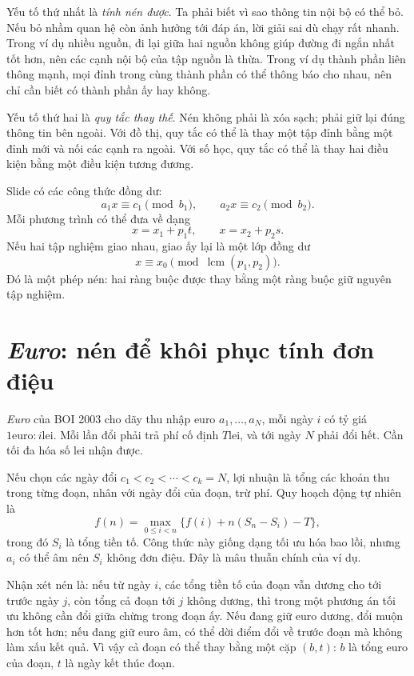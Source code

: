 \documentclass[11pt]{article}
\newcommand{\lei}{\ensuremath{\mathrm{lei}}}
\newcommand{\euro}{\ensuremath{\mathrm{euro}}}
\begin{document}
Yếu tố thứ nhất là \emph{tính nén được}. Ta phải biết vì sao thông tin nội bộ
có thể bỏ. Nếu bỏ nhầm quan hệ còn ảnh hưởng tới đáp án, lời giải sai dù chạy
rất nhanh. Trong ví dụ nhiều nguồn, đi lại giữa hai nguồn không giúp đường đi
ngắn nhất tốt hơn, nên các cạnh nội bộ của tập nguồn là thừa. Trong ví dụ
thành phần liên thông mạnh, mọi đỉnh trong cùng thành phần có thể thông báo
cho nhau, nên chỉ cần biết có thành phần ấy hay không.

Yếu tố thứ hai là \emph{quy tắc thay thế}. Nén không phải là xóa sạch; phải
giữ lại đúng thông tin bên ngoài. Với đồ thị, quy tắc có thể là thay một tập
đỉnh bằng một đỉnh mới và nối các cạnh ra ngoài. Với số học, quy tắc có thể
là thay hai điều kiện bằng một điều kiện tương đương.

Slide có các công thức đồng dư:
\[
  a_1x \equiv c_1 \pmod {b_1},\qquad
  a_2x \equiv c_2 \pmod {b_2}.
\]
Mỗi phương trình có thể đưa về dạng
\[
  x=x_1+p_1t,\qquad x=x_2+p_2s.
\]
Nếu hai tập nghiệm giao nhau, giao ấy lại là một lớp đồng dư
\[
  x\equiv x_0 \pmod{\operatorname{lcm}(p_1,p_2)}.
\]
Đó là một phép nén: hai ràng buộc được thay bằng một ràng buộc giữ nguyên tập
nghiệm.

\section{\textit{Euro}: nén để khôi phục tính đơn điệu}

\textit{Euro} của BOI 2003 cho dãy thu nhập euro \(a_1,\ldots,a_N\), mỗi
ngày \(i\) có tỷ giá \(1\euro:i\lei\). Mỗi lần đổi phải trả phí cố định
\(T\lei\), và tới ngày \(N\) phải đổi hết. Cần tối đa hóa số \(\lei\) nhận
được.

Nếu chọn các ngày đổi \(c_1<c_2<\cdots<c_k=N\), lợi nhuận là tổng các khoản
thu trong từng đoạn, nhân với ngày đổi của đoạn, trừ phí. Quy hoạch động tự
nhiên là
\[
  f(n)=\max_{0\le i<n}\{f(i)+n(S_n-S_i)-T\},
\]
trong đó \(S_i\) là tổng tiền tố. Công thức này giống dạng tối ưu hóa bao
lồi, nhưng \(a_i\) có thể âm nên \(S_i\) không đơn điệu. Đây là mâu thuẫn
chính của ví dụ.

Nhận xét nén là: nếu từ ngày \(i\), các tổng tiền tố của đoạn vẫn dương cho
tới trước ngày \(j\), còn tổng cả đoạn tới \(j\) không dương, thì trong một
phương án tối ưu không cần đổi giữa chừng trong đoạn ấy. Nếu đang giữ euro
dương, đổi muộn hơn tốt hơn; nếu đang giữ euro âm, có thể dời điểm đổi về
trước đoạn mà không làm xấu kết quả. Vì vậy cả đoạn có thể thay bằng một cặp
\((b,t)\): \(b\) là tổng euro của đoạn, \(t\) là ngày kết thúc đoạn.
\end{document}
